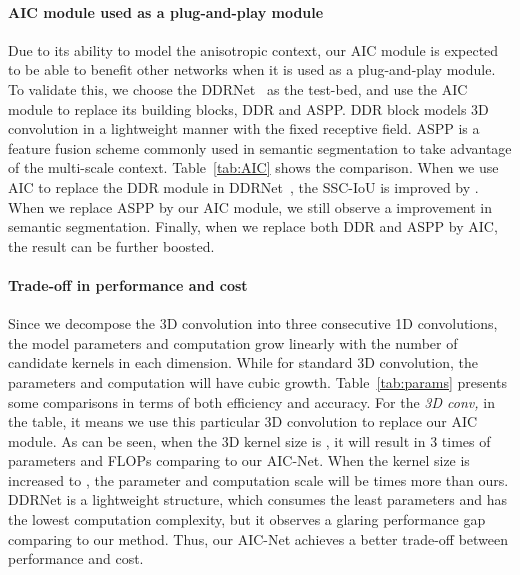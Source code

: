 \vspace{-0.3cm}
\paragraph{AIC module used as a plug-and-play module}
Due to its ability to model the anisotropic context, our AIC module is expected to be able to benefit other networks when it is used as a plug-and-play module. To validate this, we choose the DDRNet~\cite{li2019rgbd} as the test-bed, and use the AIC module to replace its building blocks, DDR and ASPP. DDR block models 3D convolution in a lightweight manner with the fixed receptive field. ASPP is a feature fusion scheme commonly used in semantic segmentation to take advantage of the multi-scale context.
Table~\ref{tab:AIC} shows the comparison. 
When we use AIC to replace the DDR module in DDRNet~\cite{li2019rgbd}, the SSC-IoU is improved by . When we replace ASPP by our AIC module, we still observe a  improvement in semantic segmentation. Finally, when we replace both DDR and ASPP by AIC, the result can be further boosted. 



\vspace{-0.3cm}
\paragraph{Trade-off in performance and cost}
Since we decompose the 3D convolution into three consecutive 1D convolutions, the model parameters and computation grow linearly with the number of candidate kernels in each dimension. While for standard 3D convolution, the parameters and computation will have cubic growth. Table~\ref{tab:params} presents some comparisons in terms of both efficiency and accuracy. For the \emph{3D conv, } in the table, it means we use this particular 3D convolution to replace our AIC module. As can be seen, when the 3D kernel size is , it will result in 3 times of parameters and FLOPs comparing to our AIC-Net. When the kernel size is increased to , the parameter and computation scale will be  times more than ours. DDRNet is a lightweight structure, which consumes the least parameters and has the lowest computation complexity, but it observes a glaring performance gap comparing to our method. Thus, our AIC-Net achieves a better trade-off between performance and cost. 












































%
